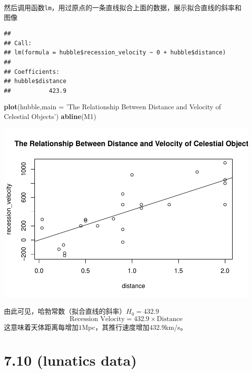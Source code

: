 \documentclass[]{article}
\newenvironment{Shaded}{\begin{snugshade}}{\end{snugshade}}
\newcommand{\DataTypeTok}[1]{\textcolor[rgb]{0.13,0.29,0.53}{#1}}
\newcommand{\DecValTok}[1]{\textcolor[rgb]{0.00,0.00,0.81}{#1}}
\newcommand{\KeywordTok}[1]{\textcolor[rgb]{0.13,0.29,0.53}{\textbf{#1}}}
\newcommand{\NormalTok}[1]{#1}
\newcommand{\OperatorTok}[1]{\textcolor[rgb]{0.81,0.36,0.00}{\textbf{#1}}}
\newcommand{\StringTok}[1]{\textcolor[rgb]{0.31,0.60,0.02}{#1}}
\begin{document}
然后调用函数\texttt{lm}，用过原点的一条直线拟合上面的数据，展示拟合直线的斜率和图像

\begin{Shaded}
\end{Shaded}

\begin{verbatim}
## 
## Call:
## lm(formula = hubble$recession_velocity ~ 0 + hubble$distance)
## 
## Coefficients:
## hubble$distance  
##           423.9
\end{verbatim}

\begin{Shaded}
\begin{Highlighting}[]
\KeywordTok{plot}\NormalTok{(hubble,}\DataTypeTok{main =} \StringTok{'The Relationship Between Distance and Velocity of Celestial Objects'}\NormalTok{)}
\KeywordTok{abline}\NormalTok{(M1)}
\end{Highlighting}
\end{Shaded}

\includegraphics{Homework_7_files/figure-latex/unnamed-chunk-2-1.pdf}

由此可见，哈勃常数（拟合直线的斜率）\(H_0=432.9\) \[
\text{Recession Velocity}=432.9\times\text{Distance}
\] 这意味着天体距离每增加\(1\)Mpc，其推行速度增加\(432.9\)km/s。

\hypertarget{lunatics-data}{%
\section{7.10 (lunatics data)}\label{lunatics-data}}
\end{document}
